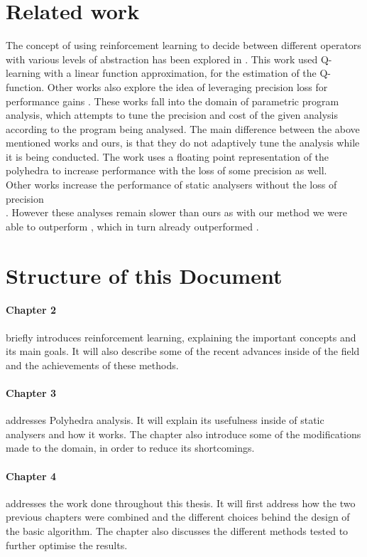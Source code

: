 \section{Related work}
The concept of using reinforcement learning to decide between different operators with various levels of abstraction has been explored in \cite{singh2018fast}. This work used Q-learning with a linear function approximation, for the estimation of the Q-function. Other works also explore the idea of leveraging precision loss for performance gains \cite{oh2015learning,oh2014selective,liang2011learning}. These works fall into the domain of parametric program analysis, which attempts to tune the precision and cost of the given analysis according to the program being analysed. The main difference between the above mentioned works and ours, is that they do not adaptively tune the analysis while it is being conducted. The work \cite{chen2008sound} uses a floating point representation of the polyhedra to increase performance with the loss of some precision as well.\\
Other works increase the performance of static analysers without the loss of precision \\ \cite{singh2015making,singh2017fast}. However these analyses remain slower than ours as with our method we were able to outperform \cite{singh2018fast}, which in turn already outperformed \cite{singh2017fast}.


\section{Structure of this Document}

\paragraph{Chapter 2}briefly introduces reinforcement learning, explaining the important concepts and its main goals. It will also describe some of the recent advances inside of the field and the achievements of these methods.

\paragraph{Chapter 3}addresses Polyhedra analysis. It will explain its usefulness inside of static analysers and how it works. The chapter also introduce some of the modifications made to the domain, in order to reduce its shortcomings.

\paragraph{Chapter 4}addresses the work done throughout this thesis. It will first address how the two previous chapters were combined and the different choices behind the design of the basic algorithm. The chapter also discusses the different methods tested to further optimise the results.

